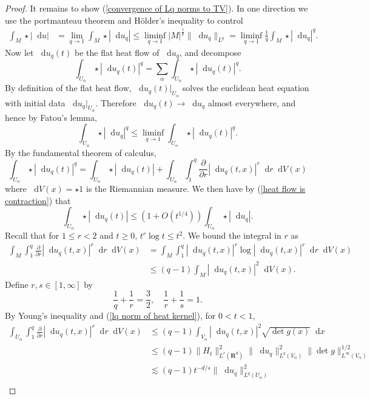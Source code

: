 \documentclass[reqno,11pt]{amsart}
\newcommand{\RR}{\mathbf{R}}
\newcommand*\dif{\mathop{}\!\mathrm{d}}
\theoremstyle{definition}
\numberwithin{equation}{section}
\begin{document}
\begin{proof}
It remains to show (\ref{convergence of Lq norms to TV}).
In one direction we use the portmanteau theorem and H\"older's inequality to control
\begin{align*}
\int_M \star |\dif u|& = \lim_{q \to 1} \int_M \star |\dif u_q| 
\leq \liminf_{q \to 1} |M|^{\frac{1}{p}} \|\dif u_q\|_{L^q} = \liminf_{q \to 1} \frac{1}{q} \int_M \star |\dif u_q|^q.
\end{align*}
Now let $\dif u_q(t)$ be the flat heat flow of $\dif u_q$, and decompose 
$$\int_{U_\alpha} \star |\dif u_q(t)|^q = \sum_\alpha \int_{U_\alpha} \star |\dif u_q(t)|^q.$$
By definition of the flat heat flow, $\dif u_q(t)|_{U_\alpha}$ solves the euclidean heat equation with initial data $\dif u_q|_{U_\alpha}$.
Therefore $\dif u_q(t) \to \dif u_q$ almost everywhere, and hence by Fatou's lemma,
\begin{equation}\label{Fatou}
\int_{U_\alpha} \star |\dif u_q|^q \leq \liminf_{q \to 1} \int_{U_\alpha} \star |\dif u_q(t)|^q.
\end{equation}
By the fundamental theorem of calculus, 
$$\int_{U_\alpha} \star |\dif u_q(t)|^q = \int_{U_\alpha} \star |\dif u_q(t)| + \int_{U_\alpha} \int_1^q \frac{\partial}{\partial r} |\dif u_q(t, x)|^r \dif r \dif V(x)$$
where $\dif V(x) = \star 1$ is the Riemannian measure.
We then have by (\ref{heat flow is contraction}) that
$$\int_{U_\alpha} \star |\dif u_q(t)| \leq (1 + O(t^{1/4})) \int_{U_\alpha} \star |\dif u_q|.$$
Recall that for $1 \leq r < 2$ and $t \geq 0$, $t^r \log t \leq t^2$.
We bound the integral in $r$ as
\begin{align*}
\int_M \int_1^q \frac{\partial}{\partial r} |\dif u_q(t, x)|^r \dif r \dif V(x)
&= \int_M \int_1^q |\dif u_q(t, x)|^r \log |\dif u_q(t, x)|^r \dif r \dif V(x) \\
&\leq (q - 1) \int_M |\dif u_q(t, x)|^2 \dif V(x).
\end{align*}
Define $r, s \in [1, \infty]$ by 
$$\frac{1}{q} + \frac{1}{r} = \frac{3}{2}, \quad \frac{1}{r} + \frac{1}{s} = 1.$$
By Young's inequality and (\ref{lq norm of heat kernel}), for $0 < t < 1$,
\begin{align*}
\int_{U_\alpha} \int_1^q \frac{\partial}{\partial r} |\dif u_q(t, x)|^r \dif r \dif V(x)
&\leq (q - 1) \int_{V_\alpha} |\dif u_q(t, x)|^2 \sqrt{\det g(x)} \dif x \\
&\leq (q - 1) \|H_t\|_{L^r(\RR^d)}^2 \|\dif u_q\|_{L^q(V_\alpha)}^2 \|\det g\|_{L^\infty(V_\alpha)}^{1/2} \\
&\lesssim (q - 1) t^{-d/s} \|\dif u_q\|_{L^q(U_\alpha)}^2 \\

\end{align*}
\end{proof}
\end{document}
